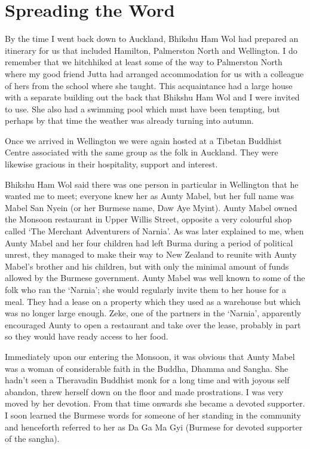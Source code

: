 \chapter{Spreading the Word}

By the time I went back down to Auckland, Bhikshu Ham Wol had prepared
an itinerary for us that included Hamilton, Palmerston North and
Wellington. I do remember that we hitchhiked at least some of the way to
Palmerston North where my good friend Jutta had arranged accommodation
for us with a colleague of hers from the school where she taught. This
acquaintance had a large house with a separate building out the
back that Bhikshu Ham Wol and I were invited to use. She also had a
swimming pool which must have been tempting, but perhaps by that time
the weather was already turning into autumn.

Once we arrived in Wellington we were again hosted at a Tibetan Buddhist
Centre associated with the same group as the folk in Auckland. They were
likewise gracious in their hospitality, support and interest.

Bhikshu Ham Wol said there was one person in particular in Wellington
that he wanted me to meet; everyone knew her as Aunty Mabel, but her
full name was Mabel San Nyein (or her Burmese name, Daw Aye Myint).
Aunty Mabel owned the Monsoon restaurant in Upper Willis Street,
opposite a very colourful shop called `The Merchant Adventurers of Narnia'.
As was later explained to me, when Aunty Mabel and her four children had
left Burma during a period of political unrest, they managed to make
their way to New Zealand to reunite with Aunty Mabel's brother and his
children, but with only the minimal amount of funds allowed by the
Burmese government. Aunty Mabel was well known to some of the folk who
ran the `Narnia'; she would regularly invite them to her house for a
meal. They had a lease on a property which they used as a warehouse but
which was no longer large enough. Zeke, one of the partners in the
`Narnia', apparently encouraged Aunty to open a restaurant and take over
the lease, probably in part so they would have ready access to her food.

Immediately upon our entering the Monsoon, it was obvious that Aunty
Mabel was a woman of considerable faith in the Buddha, Dhamma and
Sangha. She hadn't seen a Theravadin Buddhist monk for a long time and
with joyous self abandon, threw herself down on the floor and made
prostrations. I was very moved by her devotion. From that time onwards
she became a devoted supporter. I soon learned the Burmese words for
someone of her standing in the community and henceforth referred to her
as Da Ga Ma Gyi (Burmese for devoted supporter of the sangha).

